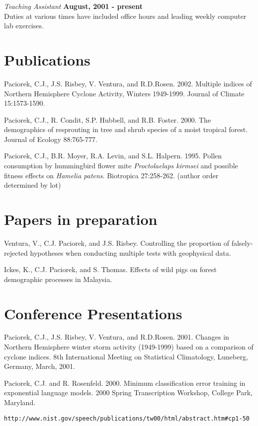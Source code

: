 \documentclass[margin,line]{res}
\begin{document}
\begin{resume}
		{\em Teaching Assistant} \hfill {\bf August, 2001  - present}\\
		Duties at various times have included 
		office hours and leading weekly computer lab exercises.
		
		
		
		\section{\sc Publications}
		Paciorek, C.J., J.S. Risbey, V. Ventura, and R.D.Rosen. 2002. Multiple indices of Northern Hemisphere Cyclone
		Activity, Winters 1949-1999. Journal of Climate 15:1573-1590.
		
		Paciorek, C.J., R. Condit, S.P. Hubbell, and R.B. Foster.  2000.
		The demographics of resprouting in tree and shrub species of a moist
		tropical forest.  Journal of Ecology 88:765-777.
		
		Paciorek, C.J., B.R. Moyer, R.A. Levin, and S.L. Halpern.  1995.
		Pollen consumption by hummingbird flower mite {\it Proctolaelaps
			kirmsei} and possible fitness effects on {\it Hamelia patens}.
		Biotropica 27:258-262.  (author order determined by lot)     
		
		\section{\sc Papers in preparation}
		
		Ventura, V., C.J. Paciorek, and J.S. Risbey.  Controlling the proportion of falsely-rejected hypotheses when conducting multiple tests with geophysical data.
		
		Ickes, K., C.J. Paciorek, and S. Thomas.  Effects of wild pigs on
		forest demographic processes in Malaysia.
		
		\section{\sc Conference Presentations}
		Paciorek, C.J., J.S. Risbey, V. Ventura, and R.D.Rosen.  2001.  Changes in Northern Hemisphere winter storm activity (1949-1999) based
		on a comparison of cyclone indices.  8th International Meeting on
		Statistical Climatology, Luneberg, Germany, March, 2001.
		
		Paciorek, C.J. and R. Rosenfeld.  2000.  Minimum classification error
		training in exponential language models.  2000 Spring Transcription
		Workshop, College Park, Maryland.
		\vspace*{-.25in}  
		\begin{verbatim}http://www.nist.gov/speech/publications/tw00/html/abstract.htm#cp1-50\end{verbatim}
		

\end{resume}
\end{document}
